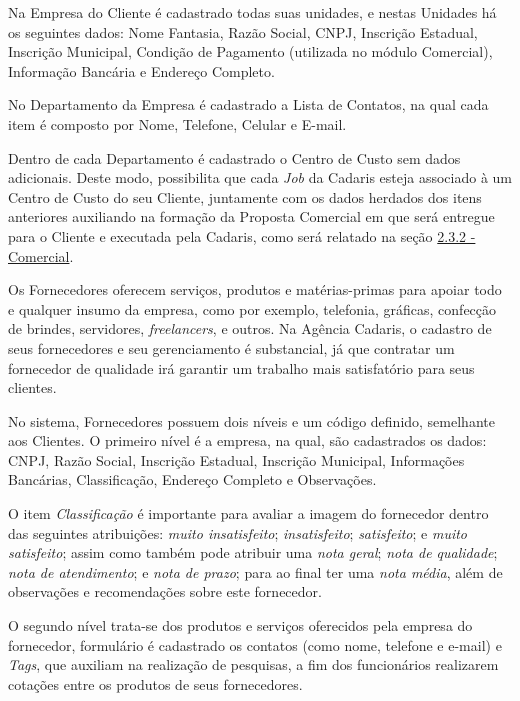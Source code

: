 \documentclass[
  12pt,				%
  openany,
  oneside,
  a4paper,			%
  english,			%
  brazil
]{article}
\numberwithin{figure}{section}
\numberwithin{table}{section}
\newcounter{subsubsubsection}[subsubsection]
\begin{document}
Na Empresa do Cliente é cadastrado todas suas unidades, e nestas Unidades há os seguintes dados: Nome Fantasia, Razão Social, CNPJ, Inscrição Estadual, Inscrição Municipal, Condição de Pagamento (utilizada no módulo Comercial), Informação Bancária e Endereço Completo.

No Departamento da Empresa é cadastrado a Lista de Contatos, na qual cada item é composto por Nome, Telefone, Celular e E-mail.

Dentro de cada Departamento é cadastrado o Centro de Custo sem dados adicionais. Deste modo, possibilita que cada \textit{Job} da Cadaris esteja associado à um Centro de Custo do seu Cliente, juntamente com os dados herdados dos itens anteriores auxiliando na formação da Proposta Comercial em que será entregue para o Cliente e executada pela Cadaris, como será relatado na seção \hyperref[sec:2.3.2]{2.3.2 - Comercial}.



Os Fornecedores oferecem serviços, produtos e matérias-primas para apoiar todo e qualquer insumo da empresa, como por exemplo, telefonia, gráficas, confecção de brindes, servidores, \textit{freelancers}, e outros. Na Agência Cadaris, o cadastro de seus fornecedores e seu gerenciamento é substancial, já que contratar um fornecedor de qualidade irá garantir um trabalho mais satisfatório para seus clientes.

No sistema, Fornecedores possuem dois níveis e um código definido, semelhante aos Clientes. O primeiro nível é a empresa, na qual, são cadastrados os dados: CNPJ, Razão Social, Inscrição Estadual, Inscrição Municipal, Informações Bancárias, Classificação, Endereço Completo e Observações.

O item \textit{Classificação} é importante para avaliar a imagem do fornecedor dentro das seguintes atribuições: \textit{muito insatisfeito}; \textit{insatisfeito}; \textit{satisfeito}; e \textit{muito satisfeito}; assim como também pode atribuir uma \textit{nota geral}; \textit{nota de qualidade}; \textit{nota de atendimento}; e \textit{nota de prazo}; para ao final ter uma \textit{nota média}, além de observações e recomendações sobre este fornecedor.

O segundo nível trata-se dos produtos e serviços oferecidos pela empresa do fornecedor, formulário é cadastrado os contatos (como nome, telefone e e-mail) e \textit{Tags}, que auxiliam na realização de pesquisas, a fim dos funcionários realizarem cotações entre os produtos de seus fornecedores.
\end{document}

